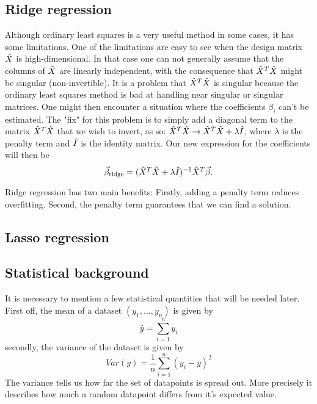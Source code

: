 \documentclass[a4paper,12pt]{article}
\begin{document}
\subsection{Ridge regression}
Although ordinary least squares is a very useful method in some cases, it has some limitations. One of the limitations are easy to see when the design matrix $\Hat{X}$ is high-dimensional. In that case one can not generally assume that the columns of $\Hat{X}$ are linearly independent, with the consequence that $\Hat{X}^T\Hat{X}$ might be singular (non-invertible). It is a problem that $\Hat{X}^T\Hat{X}$ is singular because the ordinary least squares method is bad at handling near singular or singular matrices. One might then encounter a situation where the coefficients $\beta_i$ can't be estimated.\newline
The "fix" for this problem is to simply add a diagonal term to the matrix $\Hat{X}^T\Hat{X}$ that we wish to invert, as so: $\Hat{X}^T\Hat{X} \rightarrow \Hat{X}^T\Hat{X} + \lambda \Hat{I}$, where $\lambda$ is the penalty term and $\Hat{I}$ is the identity matrix. Our new expression for the coefficients will then be
\begin{equation}
\vec{\beta}_{\text{ridge}}=(\hat{X}^T\hat{X}+\lambda \Hat{I})^{-1}\hat{X}^T\vec{\beta}.
\end{equation}



Ridge regression has two main benefits: Firstly, adding a penalty term reduces overfitting. Second, the penalty term guarantees that we can find a solution.


\subsection{Lasso regression}

\subsection{Statistical background}
It is necessary to mention a few statistical quantities that will be needed later. First off, the mean of a dataset $(y_1, ..., y_n)$ is given by
\begin{equation}
\bar{y}=\sum_{i=1}^n y_i
\end{equation}
secondly, the variance of the dataset is given by
\begin{equation}
Var(y)=\frac{1}{n}\sum_{i=1}^n(y_i-\bar{y})^2
\end{equation}
The variance tells us how far the set of datapoints is spread out. More precisely it describes how much a random datapoint differs from it's expected value. \newline
\end{document}
